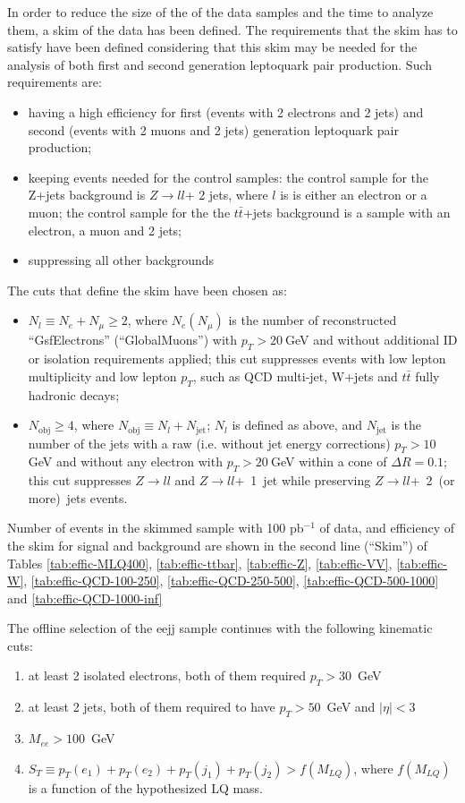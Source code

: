 In order to reduce the size of the of the data samples and the time to analyze them, a skim of the 
data has been defined.
The requirements that the skim has to satisfy have been defined considering that this skim may be needed
for the analysis of both first and second generation leptoquark pair production. Such requirements are:
\begin{itemize}
\item having a high efficiency for first (events with 2 electrons and 2 jets) and second (events with 
2 muons and 2 jets) generation leptoquark pair production; 
\item keeping events needed for the control samples: the control sample for the Z+jets background is $Z\rightarrow l l$+ 2 jets,
where $l$ is is either an electron or a muon; the control sample for the the $t\bar{t}$+jets background is a sample 
with an electron, a muon and 2 jets;
\item suppressing all other backgrounds
\end{itemize}
The cuts that define the skim have been chosen as:
\begin{itemize}
\item $N_l \equiv N_e + N_{\mu} \ge 2$, where $N_e (N_{\mu})$ 
is the number of reconstructed ``GsfElectrons'' (``GlobalMuons'')
with $p_T>20~$GeV and without additional ID 
or isolation requirements applied; this cut suppresses events with low 
lepton multiplicity and low lepton $p_T$, such as QCD multi-jet, W+jets and $t\bar{t}$ fully hadronic decays;
\item $N_{\mathrm{obj}} \ge 4$, where $N_{\mathrm{obj}} \equiv N_l + N_{\mathrm{jet}}$; $N_l$ is defined as above, and
$N_{\mathrm{jet}}$ is the number of the jets with a raw (i.e. without jet energy corrections) $p_T > 10~$GeV and without 
any electron with $p_T > 20~$GeV within a cone of $\Delta R=0.1$; this cut suppresses $Z \rightarrow ll$ and 
$Z \rightarrow ll$+~1~jet while preserving $Z \rightarrow ll$+~2~(or more)~jets events.
\end{itemize}

Number of events in the skimmed sample with 100 pb$^{-1}$ of data, and 
efficiency of the skim for signal and background are shown in the second line (``Skim'') 
of Tables
\ref{tab:effic-MLQ400}, 
\ref{tab:effic-ttbar}, 
\ref{tab:effic-Z}, 
\ref{tab:effic-VV},
\ref{tab:effic-W},
\ref{tab:effic-QCD-100-250},
\ref{tab:effic-QCD-250-500},
\ref{tab:effic-QCD-500-1000} and
\ref{tab:effic-QCD-1000-inf}

The offline selection of the eejj sample continues with the following kinematic cuts:
%
\begin{enumerate}
\item at least 2 isolated electrons, both of them required $p_T>30$~GeV 
\item at least 2 jets, both of them required to have $p_T>50$~GeV and $|\eta|<3$
\item $M_{ee}>100$~GeV
\item $S_T\equiv p_T(e_1)+p_T(e_2)+p_T(j_1)+p_T(j_2)>f(M_{LQ})$, where $f(M_{LQ})$ is a function 
of the hypothesized LQ mass.
\end{enumerate}
%

